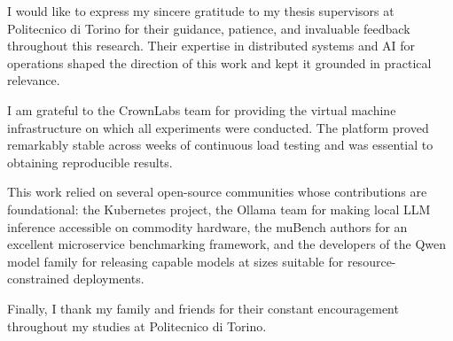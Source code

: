 
I would like to express my sincere gratitude to my thesis supervisors at Politecnico
di Torino for their guidance, patience, and invaluable feedback throughout this
research. Their expertise in distributed systems and AI for operations shaped the
direction of this work and kept it grounded in practical relevance.

I am grateful to the CrownLabs team for providing the virtual machine infrastructure
on which all experiments were conducted. The platform proved remarkably stable across
weeks of continuous load testing and was essential to obtaining reproducible results.

This work relied on several open-source communities whose contributions are foundational:
the Kubernetes project, the Ollama team for making local LLM inference accessible on
commodity hardware, the muBench authors for an excellent microservice benchmarking
framework, and the developers of the Qwen model family for releasing capable models
at sizes suitable for resource-constrained deployments.

Finally, I thank my family and friends for their constant encouragement throughout
my studies at Politecnico di Torino.

\vspace*{5\baselineskip}